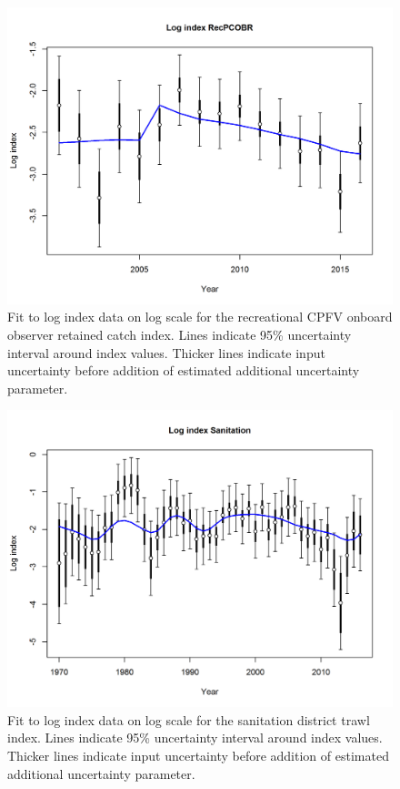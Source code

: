 \documentclass[12pt,]{article}
\begin{document}
\begin{figure}[htbp]
\centering
\includegraphics{r4ss/plots_mod1/index5_logcpuefit_RecPCOBR.png}
\caption{Fit to log index data on log scale for the recreational CPFV
onboard observer retained catch index. Lines indicate 95\% uncertainty
interval around index values. Thicker lines indicate input uncertainty
before addition of estimated additional uncertainty parameter.
\label{fig:Fleet12_index5_logcpuefit_RecPCOBR}}
\end{figure}

\begin{figure}[htbp]
\centering
\includegraphics{r4ss/plots_mod1/index5_logcpuefit_Sanitation.png}
\caption{Fit to log index data on log scale for the sanitation district
trawl index. Lines indicate 95\% uncertainty interval around index
values. Thicker lines indicate input uncertainty before addition of
estimated additional uncertainty parameter.
\label{fig:index5_logcpuefit_Sanitation}}
\end{figure}
\end{document}
